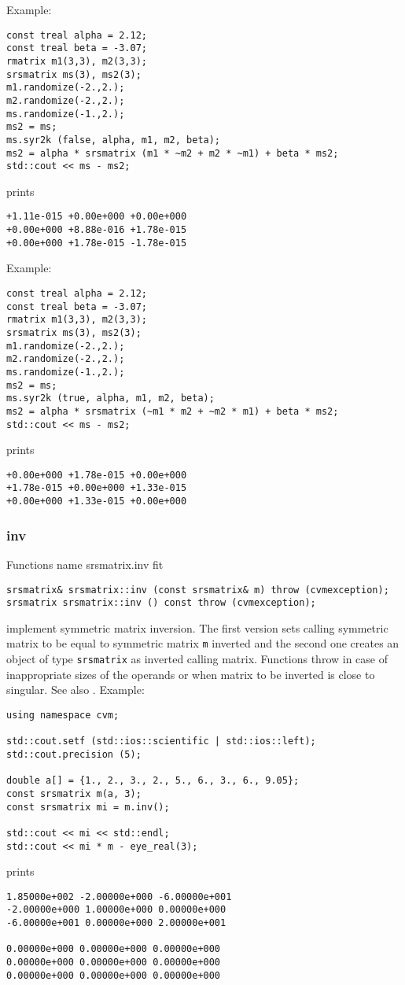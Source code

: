 Example:
\begin{Verbatim}
const treal alpha = 2.12;
const treal beta = -3.07;
rmatrix m1(3,3), m2(3,3);
srsmatrix ms(3), ms2(3);
m1.randomize(-2.,2.);
m2.randomize(-2.,2.);
ms.randomize(-1.,2.);
ms2 = ms;
ms.syr2k (false, alpha, m1, m2, beta);
ms2 = alpha * srsmatrix (m1 * ~m2 + m2 * ~m1) + beta * ms2;
std::cout << ms - ms2;
\end{Verbatim}
prints
\begin{Verbatim}
+1.11e-015 +0.00e+000 +0.00e+000
+0.00e+000 +8.88e-016 +1.78e-015
+0.00e+000 +1.78e-015 -1.78e-015
\end{Verbatim}
Example:
\begin{Verbatim}
const treal alpha = 2.12;
const treal beta = -3.07;
rmatrix m1(3,3), m2(3,3);
srsmatrix ms(3), ms2(3);
m1.randomize(-2.,2.);
m2.randomize(-2.,2.);
ms.randomize(-1.,2.);
ms2 = ms;
ms.syr2k (true, alpha, m1, m2, beta);
ms2 = alpha * srsmatrix (~m1 * m2 + ~m2 * m1) + beta * ms2;
std::cout << ms - ms2;
\end{Verbatim}
prints
\begin{Verbatim}
+0.00e+000 +1.78e-015 +0.00e+000
+1.78e-015 +0.00e+000 +1.33e-015
+0.00e+000 +1.33e-015 +0.00e+000
\end{Verbatim}
\newpage









\subsubsection{inv}
Functions%
\pdfdest name {srsmatrix.inv} fit
\begin{verbatim}
srsmatrix& srsmatrix::inv (const srsmatrix& m) throw (cvmexception);
srsmatrix srsmatrix::inv () const throw (cvmexception);
\end{verbatim}
implement symmetric matrix inversion.
The first version sets  calling symmetric matrix to be equal to 
 symmetric matrix \verb"m" inverted and the second one
creates an object of type \verb"srsmatrix" as inverted calling matrix.
Functions throw   
in case of inappropriate
sizes of the operands or when  matrix to be inverted is close to
singular.
See also
.
Example:
\begin{Verbatim}
using namespace cvm;

std::cout.setf (std::ios::scientific | std::ios::left); 
std::cout.precision (5);

double a[] = {1., 2., 3., 2., 5., 6., 3., 6., 9.05};
const srsmatrix m(a, 3);
const srsmatrix mi = m.inv();

std::cout << mi << std::endl;
std::cout << mi * m - eye_real(3);
\end{Verbatim}
prints
\begin{Verbatim}
1.85000e+002 -2.00000e+000 -6.00000e+001
-2.00000e+000 1.00000e+000 0.00000e+000
-6.00000e+001 0.00000e+000 2.00000e+001

0.00000e+000 0.00000e+000 0.00000e+000
0.00000e+000 0.00000e+000 0.00000e+000
0.00000e+000 0.00000e+000 0.00000e+000
\end{Verbatim}
\newpage




